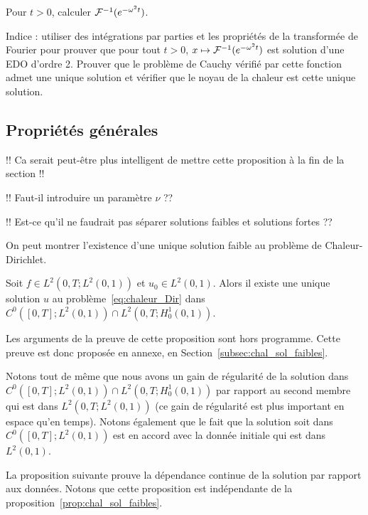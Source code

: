 \documentclass[12pt,a4paper,twoside]{article}
\begin{document}
\begin{exercise}
  Pour $t > 0$, calculer $\mathcal{F}^{-1}(e^{-\omega^2 t})$.

  Indice : utiliser des int\'egrations par parties et les propri\'et\'es de la transform\'ee
  de Fourier pour prouver que pour tout $t > 0$, $x \mapsto \mathcal{F}^{-1}(e^{-\omega^2 t})$ est solution
  d'une EDO d'ordre 2.
  Prouver que le probl\`eme de Cauchy v\'erifi\'e par cette fonction admet une unique solution
  et v\'erifier que le noyau de la chaleur est cette unique solution.
\end{exercise}

\subsection{Propri\'et\'es g\'en\'erales}
\label{subsec:chaleur_prop}


!! Ca serait peut-\^etre plus intelligent de mettre cette proposition \`a la fin de la section !!

!! Faut-il introduire un param\`etre $\nu$ ??

!! Est-ce qu'il ne faudrait pas s\'eparer solutions faibles et solutions fortes ??

On peut montrer l'existence d'une unique solution faible au probl\`eme de Chaleur-Dirichlet.


\begin{proposition}
  \label{prop:chal_sol_faibles}
  Soit $f \in L^2(0,T;L^2(0,1))$ et $u_0 \in L^2(0,1)$.
  Alors il existe une unique solution $u$ au probl\`eme~\eqref{eq:chaleur_Dir}
  dans $C^0([0,T];L^2(0,1)) \cap L^2(0,T;H_0^1(0,1))$.
\end{proposition}
Les arguments de la preuve de cette proposition sont hors programme.
Cette preuve est donc propos\'ee en annexe, en Section~\ref{subsec:chal_sol_faibles}.

Notons tout de m\^eme que nous avons un gain de r\'egularit\'e de la solution
dans $C^0([0,T];L^2(0,1)) \cap L^2(0,T;H_0^1(0,1))$
par rapport au second membre qui est dans $L^2(0,T;L^2(0,1))$
(ce gain de r\'egularit\'e est plus important en espace qu'en temps).
Notons \'egalement que le fait que la solution soit dans $C^0([0,T];L^2(0,1))$
est en accord avec la donn\'ee initiale qui est dans $L^2(0,1)$.

La proposition suivante prouve la d\'ependance continue de la solution
par rapport aux donn\'ees.
Notons que cette proposition est ind\'ependante de la
proposition~\ref{prop:chal_sol_faibles}.
\end{document}
